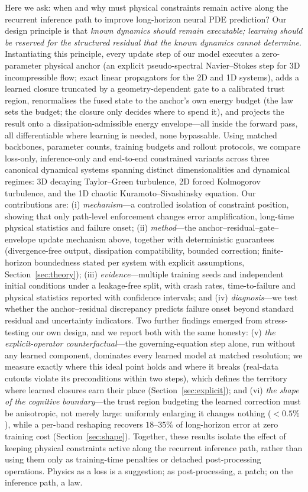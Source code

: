 \documentclass[11pt,a4paper]{article}
\begin{document}
Here we ask: when and why must physical constraints remain active along the recurrent inference path to improve long-horizon neural PDE prediction? Our design principle is that \emph{known dynamics should remain executable; learning should be reserved for the structured residual that the known dynamics cannot determine}. Instantiating this principle, every update step of our model executes a zero-parameter physical anchor (an explicit pseudo-spectral Navier--Stokes step for 3D incompressible flow; exact linear propagators for the 2D and 1D systems), adds a learned closure truncated by a geometry-dependent gate to a calibrated trust region, renormalises the fused state to the anchor's own energy budget (the law sets the budget; the closure only decides where to spend it), and projects the result onto a dissipation-admissible energy envelope---all inside the forward pass, all differentiable where learning is needed, none bypassable. Using matched backbones, parameter counts, training budgets and rollout protocols, we compare loss-only, inference-only and end-to-end constrained variants across three canonical dynamical systems spanning distinct dimensionalities and dynamical regimes: 3D decaying Taylor--Green turbulence, 2D forced Kolmogorov turbulence, and the 1D chaotic Kuramoto--Sivashinsky equation. Our contributions are: (i) \emph{mechanism}---a controlled isolation of constraint position, showing that only path-level enforcement changes error amplification, long-time physical statistics and failure onset; (ii) \emph{method}---the anchor--residual--gate--envelope update mechanism above, together with deterministic guarantees (divergence-free output, dissipation compatibility, bounded correction; finite-horizon boundedness stated per system with explicit assumptions, Section~\ref{sec:theory}); (iii) \emph{evidence}---multiple training seeds and independent initial conditions under a leakage-free split, with crash rates, time-to-failure and physical statistics reported with confidence intervals; and (iv) \emph{diagnosis}---we test whether the anchor--residual discrepancy predicts failure onset beyond standard residual and uncertainty indicators. Two further findings emerged from stress-testing our own design, and we report both with the same honesty: (v) \emph{the explicit-operator counterfactual}---the governing-equation step alone, run without any learned component, dominates every learned model at matched resolution; we measure exactly where this ideal point holds and where it breaks (real-data cutouts violate its preconditions within two steps), which defines the territory where learned closures earn their place (Section~\ref{sec:explicit}); and (vi) \emph{the shape of the cognitive boundary}---the trust region budgeting the learned correction must be anisotropic, not merely large: uniformly enlarging it changes nothing ($<0.5\%$), while a per-band reshaping recovers $18$--$35\%$ of long-horizon error at zero training cost (Section~\ref{sec:shape}). Together, these results isolate the effect of keeping physical constraints active along the recurrent inference path, rather than using them only as training-time penalties or detached post-processing operations. Physics as a loss is a suggestion; as post-processing, a patch; on the inference path, a law.
\end{document}

